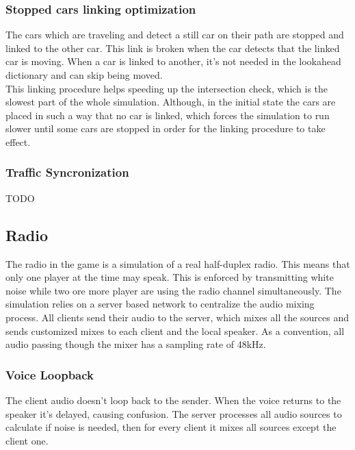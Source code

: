 \documentclass{article}
\begin{document}
\subsubsection{Stopped cars linking optimization}
The cars which are traveling and detect a still car on their path are stopped and linked to the other car. This link is broken when the car detects that the linked car is moving. When a car is linked to another, it's not needed in the lookahead dictionary and can skip being moved. \\
This linking procedure helps speeding up the intersection check, which is the slowest part of the whole simulation. Although, in the initial state the cars are placed in such a way that no car is linked, which forces the simulation to run slower until some cars are stopped in order for the linking procedure to take effect.

\subsubsection{Traffic Syncronization}
TODO

\clearpage

\subsection{Radio}
The radio in the game is a simulation of a real half-duplex radio. This means that only one player at the time may speak. This is enforced by transmitting white noise while two ore more player are using the radio channel simultaneously. The simulation relies on a server based network to centralize the audio mixing process. All clients send their audio to the server, which mixes all the sources and sends customized mixes to each client and the local speaker. As a convention, all audio passing though the mixer has a sampling rate of 48kHz. 
\subsubsection{Voice Loopback}
The client audio doesn't loop back to the sender. When the voice returns to the speaker it's delayed, causing confusion. The server processes all audio sources to calculate if noise is needed, then for every client it mixes all sources except the client one.
\end{document}
